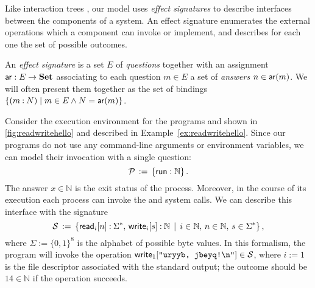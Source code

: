 Like interaction trees \cite{itrees},
our model uses \emph{effect signatures}
to describe interfaces between the components of a system.
An effect signature enumerates
the external operations which
a component can invoke or implement,
and describes for each one
the set of possible outcomes.

\begin{definition} \label{def:esig}
An \emph{effect signature} is a set $E$ of \emph{questions}
together with an assignment $ \mathsf{ar}  : E \rightarrow \mathbf{Set}$
associating to each question $m \in E$
a set of \emph{answers} $n \in  \mathsf{ar} (m)$.
We will often present them together as the set of bindings
$\{ (m \mathbin: N) \mid m \in E \wedge N =  \mathsf{ar} (m) \}$.
\end{definition}


\begin{example} \label{ex:fdsig} %
Consider the execution environment
for the programs  and 
shown in \autoref{fig:readwritehello} and
described in Example~\ref{ex:readwritehello}.
Since our programs
do not use any command-line arguments or environment variables,
we can model their invocation with a single question:
\[
  \mathcal{P} \, := \,
    \{  \mathsf{run}  : \mathbb{N} \}
  \,.
\]
The answer $x \in \mathbb{N}$ is the exit status of the process.
Moreover, in the course of its execution
each process can invoke the  and  system calls.
We can describe this interface with the signature
\[
  \mathcal{S} \, := \, \{
     \mathsf{read} _i[n] \mathbin: \Sigma^* , \,
     \mathsf{write} _i[s] \mathbin: \mathbb{N} \, \mid \,
    i \in \mathbb{N}, \,
    n \in \mathbb{N}, \,
    s \in \Sigma^*
  \}
  \,,
\]
where $\Sigma := \{0,1\}^8$ is the alphabet of possible byte values.
In this formalism,
the program  will invoke
the operation
$ \mathsf{write} _1[\texttt{"uryyb, jbeyq!\textbackslash{}n"}]
 \in \mathcal{S}$,
where $i := 1$ is the file descriptor associated with the standard output;
the outcome should be $14 \in \mathbb{N}$
if the operation succeeds.
\end{example}

